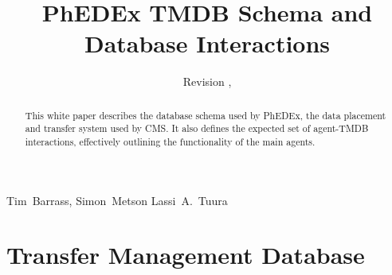 \documentclass{cmspaper}
\begin{document}
\begin{titlepage}
  \whitepaper
  \date{Revision \RCSRevision, \RCSDate}
  \title{PhEDEx TMDB Schema and Database Interactions}

  \begin{Authlist}
    Tim~Barrass, Simon~Metson
    Lassi~A.~Tuura
  \end{Authlist}

  \begin{abstract}
    This white paper describes the database schema used by PhEDEx,
    the data placement and transfer system used by CMS.  It also
    defines the expected set of agent-TMDB interactions, effectively
    outlining the functionality of the main agents.
  \end{abstract}

\end{titlepage}

\setcounter{page}{2}

\section{Transfer Management Database}

\end{document}
